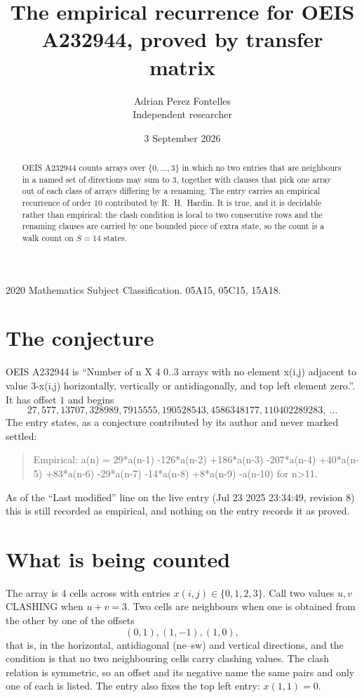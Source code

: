 \documentclass[11pt,a4paper]{article}
\title{The empirical recurrence for OEIS A232944, proved by transfer matrix}
\author{Adrian Perez Fontelles\\ \small Independent researcher}
\date{3 September 2026}
\theoremstyle{plain}
\theoremstyle{definition}
\begin{document}
\maketitle

\begin{abstract}
OEIS A232944 counts arrays over $\{0,\dots,3\}$ in which no two entries that are neighbours in
a named set of directions may sum to $3$, together with clauses that pick one array out of
each class of arrays differing by a renaming. The entry carries an empirical recurrence of
order $10$ contributed by R.~H.~Hardin. It is true, and it is decidable rather than
empirical: the clash condition is local to two consecutive rows and the renaming clauses are
carried by one bounded piece of extra state, so the count is a walk count on $S=14$ states.
\end{abstract}

\noindent\small 2020 Mathematics Subject Classification. 05A15, 05C15, 15A18.\normalsize

\section{The conjecture}

OEIS A232944 is ``Number of n X 4 0..3 arrays with no element x(i,j) adjacent to value 3-x(i,j) horizontally, vertically or antidiagonally, and top left element zero.''. It has offset $1$ and begins
\[
27, 577, 13707, 328989, 7915555, 190528543, 4586348177, 110402289283,\ \dots
\]
The entry states, as a conjecture contributed by its author and never marked settled:
\begin{quote}
Empirical: a(n) = 29*a(n-1) -126*a(n-2) +186*a(n-3) -207*a(n-4) +40*a(n-5) +83*a(n-6) -29*a(n-7) -14*a(n-8) +8*a(n-9) -a(n-10) for n>11.
\end{quote}
As of the ``Last modified'' line on the live entry (Jul 23 2025 23:34:49, revision 8) this is still
recorded as empirical, and nothing on the entry records it as proved.

\section{What is being counted}

The array is $4$ cells across with entries $x(i,j)\in\{0,1,2,3\}$. Call two values $u,v$ CLASHING
when $u+v=3$. Two cells are neighbours when one is obtained from the other by one of
the offsets
\[
(0,1), (1,-1), (1,0),
\]
that is, in the horizontal, antidiagonal (ne--sw) and vertical directions, and the condition is that no two neighbouring cells carry
clashing values. The clash relation is symmetric, so an offset and its negative name the
same pairs and only one of each is listed. The entry also fixes the top left entry: $x(1,1)=0$.
\end{document}
